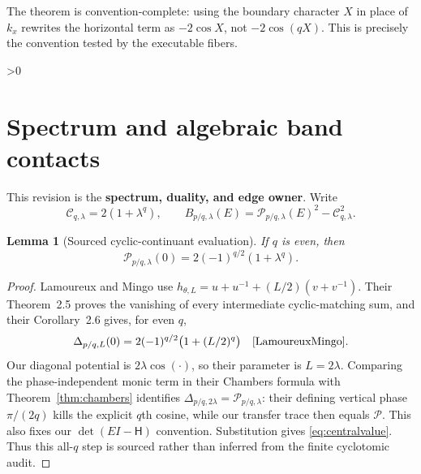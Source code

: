 \documentclass[10pt]{article}
\providecommand{\CRevisionRound}{2}
\newtheorem{lemma}{Lemma}
\newcommand{\HH}{\mathsf H}
\newcommand{\PP}{\mathcal P}
\newcommand{\CC}{\mathcal C}
\begin{document}
The theorem is convention-complete: using the boundary character $X$ in
place of $k_x$ rewrites the horizontal term as $-2\cos X$, not
$-2\cos(qX)$.  This is precisely the convention tested by the executable
fibers.

\ifnum\CRevisionRound>0
\section{Spectrum and algebraic band contacts}
This revision is the \textbf{spectrum, duality, and edge owner}.  Write
\begin{equation}
 \CC_{q,\lambda}=2(1+\lambda^q),\qquad
 B_{p/q,\lambda}(E)=\PP_{p/q,\lambda}(E)^2-\CC_{q,\lambda}^2.
 \label{eq:edgepoly}
\end{equation}

\begin{lemma}[Sourced cyclic-continuant evaluation]\label{lem:central}
If $q$ is even, then
\begin{equation}
 \PP_{p/q,\lambda}(0)=2(-1)^{q/2}(1+\lambda^q).
 \label{eq:centralvalue}
\end{equation}
\end{lemma}

\begin{proof}
Lamoureux and Mingo use
$h_{\theta,L}=u+u^{-1}+(L/2)(v+v^{-1})$.  Their Theorem~2.5 proves the
vanishing of every intermediate cyclic-matching sum, and their
Corollary~2.6 gives, for even $q$,
\[
 \Delta_{p/q,L}(0)=2(-1)^{q/2}\bigl(1+(L/2)^q\bigr)
 \quad\cite{LamoureuxMingo}.
\]
Our diagonal potential is $2\lambda\cos(\cdot)$, so their parameter is
$L=2\lambda$.  Comparing the phase-independent monic term in their
Chambers formula with Theorem~\ref{thm:chambers} identifies
$\Delta_{p/q,2\lambda}=\PP_{p/q,\lambda}$: their defining vertical phase
$\pi/(2q)$ kills the explicit $q$th cosine, while our transfer trace then
equals $\PP$.  This also fixes our
$\det(EI-\HH)$ convention.  Substitution gives \eqref{eq:centralvalue}.
Thus this all-$q$ step is sourced rather than inferred from the finite
cyclotomic audit.
\end{proof}
\end{document}

